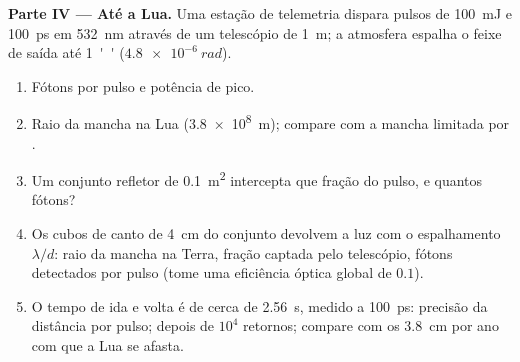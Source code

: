 \begin{problem}
\textbf{Parte IV --- Até a Lua.}
Uma estação de telemetria dispara pulsos de \qty{100}{mJ} e \qty{100}{ps} em
\qty{532}{nm} através de um telescópio de \qty{1}{m}; a atmosfera espalha
o feixe de saída até \qty{1}{''} ($\qty{4.8e-6}{rad}$).
\begin{enumerate}[resume]
  \item Fótons por pulso e potência de pico.
  \item Raio da mancha na Lua (\qty{3.8e8}{m}); compare com a
        mancha limitada por .
  \item Um conjunto refletor de \qty{0.1}{m^2} intercepta que fração
        do pulso, e quantos fótons?
  \item Os cubos de canto de \qty{4}{cm} do conjunto devolvem a luz com o
        espalhamento $\lambda/d$: raio da mancha na Terra, fração captada pelo
        telescópio, fótons detectados por pulso (tome uma eficiência
        óptica global de $0.1$).
  \item O tempo de ida e volta é de cerca de \qty{2.56}{s}, medido a
        \qty{100}{ps}: precisão da distância por pulso; depois de $10^4$
        retornos; compare com os \qty{3.8}{cm} por ano com que a
        Lua se afasta.
\end{enumerate}
\end{problem}
